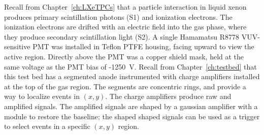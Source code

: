 Recall from Chapter~\ref{ch:LXeTPCs} that a particle interaction in liquid xenon produces primary scintillation photons (S1) and ionization electrons. The ionization electrons are drifted with an electric field into the gas phase, where they produce secondary scintillation light (S2). A single Hamamatsu R8778 \ac{VUV}-sensitive \ac{PMT} was installed in Teflon \ac{PTFE} housing, facing upward to view the active region. Directly above the \ac{PMT} was a copper shield mask, held at the same voltage as the \ac{PMT} bias of -1250~V. Recall from Chapter~\ref{ch:testbed} that this test bed has a segmented anode instrumented with charge amplifiers installed at the top of the gas region. The segments are concentric rings, and provide a way to localize events in $(x,y)$. The charge amplifiers produce raw and amplified signals. The amplified signals are shaped by a gaussian amplifier with a module to restore the baseline; the shaped shaped signals can be used as a trigger to select events in a specific $(x,y)$ region. 







